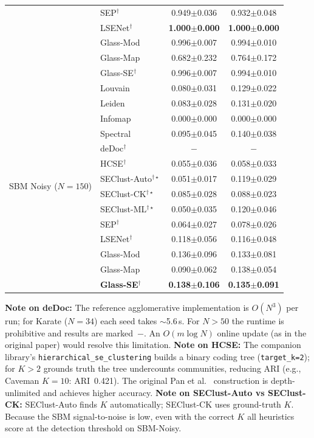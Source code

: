 {\begin{longtable}{@{}llcc@{}}
  & SEP$^\dagger$               & 0.949$\pm$0.036 & 0.932$\pm$0.048 \\
  & LSENet$^\dagger$            & \textbf{1.000$\pm$0.000} & \textbf{1.000$\pm$0.000} \\
  & Glass-Mod                   & 0.996$\pm$0.007 & 0.994$\pm$0.010 \\
  & Glass-Map                   & 0.682$\pm$0.232 & 0.764$\pm$0.172 \\
  & Glass-SE$^\dagger$          & 0.996$\pm$0.007 & 0.994$\pm$0.010 \\
\midrule
\multirow{14}{*}{SBM Noisy ($N{=}150$)}
  & Louvain                     & 0.080$\pm$0.031 & 0.129$\pm$0.022 \\
  & Leiden                      & 0.083$\pm$0.028 & 0.131$\pm$0.020 \\
  & Infomap                     & 0.000$\pm$0.000 & 0.000$\pm$0.000 \\
  & Spectral                    & 0.095$\pm$0.045 & 0.140$\pm$0.038 \\
  & deDoc$^\dagger$              & $-$ & $-$ \\
  & HCSE$^\dagger$              & 0.055$\pm$0.036 & 0.058$\pm$0.033 \\
  & SEClust-Auto$^{\dagger\star}$ & 0.051$\pm$0.017 & 0.119$\pm$0.029 \\
  & SEClust-CK$^{\dagger\star}$  & 0.085$\pm$0.028 & 0.088$\pm$0.023 \\
  & SEClust-ML$^{\dagger\star}$  & 0.050$\pm$0.035 & 0.120$\pm$0.046 \\
  & SEP$^\dagger$               & 0.064$\pm$0.027 & 0.078$\pm$0.026 \\
  & LSENet$^\dagger$            & 0.118$\pm$0.056 & 0.116$\pm$0.048 \\
  & Glass-Mod                   & 0.136$\pm$0.096 & 0.133$\pm$0.081 \\
  & Glass-Map                   & 0.090$\pm$0.062 & 0.138$\pm$0.054 \\
  & \textbf{Glass-SE}$^\dagger$  & \textbf{0.138$\pm$0.106} & \textbf{0.135$\pm$0.091} \\
\bottomrule
\end{longtable}
}

\noindent\textbf{Note on deDoc:}
The reference agglomerative implementation is $O(N^3)$ per run; for Karate
($N{=}34$) each seed takes $\sim$5.6\,s.
For $N{>}50$ the runtime is prohibitive and results are marked~$-$.
An $O(m \log N)$ online update (as in the original paper) would resolve
this limitation.
\textbf{Note on HCSE:}
The companion library's \texttt{hierarchical\_se\_clustering} builds a binary
coding tree (\texttt{target\_k=2}); for $K{>}2$ grounds truth the tree
undercounts communities, reducing ARI (e.g., Caveman $K{=}10$: ARI~0.421).
The original Pan et al.~\cite{pan2021information} construction is
depth-unlimited and achieves higher accuracy.
\textbf{Note on SEClust-Auto vs SEClust-CK:}
SEClust-Auto finds $K$ automatically; SEClust-CK uses ground-truth $K$.
Because the SBM signal-to-noise is low, even with the correct $K$ all
heuristics score at the detection threshold on SBM-Noisy.

